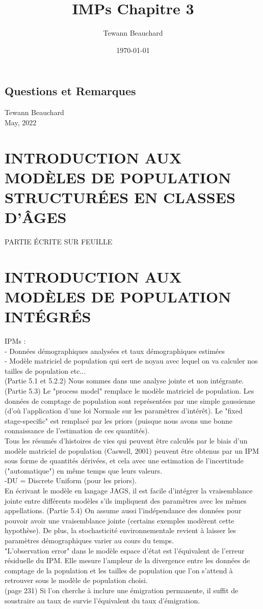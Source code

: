 \documentclass[12pt,a4paper]{article}
\title{IMPs Chapitre 3}
\date{\today}
\author{Tewann Beauchard}
\begin{document}
\begin{center}
\section*{Questions et Remarques}
\vspace*{1cm}
Tewann Beauchard \\
\vspace*{1cm}
May, 2022
\end{center}
\vspace*{1cm}



\section{INTRODUCTION AUX MODÈLES DE POPULATION STRUCTURÉES EN CLASSES D'ÂGES}
PARTIE ÉCRITE SUR FEUILLE

\section{INTRODUCTION AUX MODÈLES DE POPULATION INTÉGRÉS}
IPMs :\\ - Données démographiques analysées et taux démographiques estimées\\
- Modèle matriciel de population qui sert de noyau avec lequel on va calculer nos tailles de population etc...\\
(Partie 5.1 et 5.2.2) Nous sommes dans une analyse jointe et non intégrante.\\
(Partie 5.3) Le "process model" remplace le modèle matriciel de population. Les données de comptage de population sont représentées par une simple gaussienne (d'où l'application d'une loi Normale sur les paramètres d'intérêt). Le "fixed stage-specific" est remplacé par les priors (puisque nous avons une bonne connaissance de l’estimation de ces quantités).\\

Tous les résumés d'histoires de vies qui peuvent être calculés par le biais d'un modèle matriciel de population (Caswell, 2001) peuvent être obtenus par un IPM sous forme de quantités dérivées, et cela avec une estimation de l'incertitude ("automatique") en même temps que leurs valeurs.\\
-DU = Discrete Uniform (pour les priors).\\
En écrivant le modèle en langage JAGS, il est facile d'intégrer la vraisemblance jointe entre différents modèles s'ils impliquent des paramètres avec les mêmes appellations. (Partie 5.4) On assume aussi l'indépendance des données pour pouvoir avoir une vraisemblance jointe (certains exemples modèrent cette hypothèse). De plus, la stochasticité environnementale revient à laisser les paramètres démographiques varier au cours du temps.\\
"L'observation error" dans le modèle espace d'état est l'équivalent de l'erreur résiduelle du IPM. Elle mesure l'ampleur de la divergence entre les données de comptage de la population et les tailles de population que l'on s'attend à retrouver sous le modèle de population choisi.\\
(page 231) Si l'on cherche à inclure une émigration permanente, il suffit de soustraire au taux de survie l'équivalent du taux d'émigration.
\end{document}
